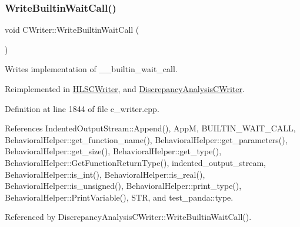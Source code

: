 \subsubsection{\texorpdfstring{Write\+Builtin\+Wait\+Call()}{WriteBuiltinWaitCall()}}
{\footnotesize\ttfamily void C\+Writer\+::\+Write\+Builtin\+Wait\+Call (\begin{DoxyParamCaption}{ }\end{DoxyParamCaption})\hspace{0.3cm}{\ttfamily [virtual]}}



Writes implementation of \+\_\+\+\_\+builtin\+\_\+wait\+\_\+call. 



Reimplemented in \hyperlink{classHLSCWriter_a7261192f62610bd053e5c35361ae1054}{H\+L\+S\+C\+Writer}, and \hyperlink{classDiscrepancyAnalysisCWriter_a614b57f4cd76435c0b7266ac677145d5}{Discrepancy\+Analysis\+C\+Writer}.



Definition at line 1844 of file c\+\_\+writer.\+cpp.



References Indented\+Output\+Stream\+::\+Append(), AppM, B\+U\+I\+L\+T\+I\+N\+\_\+\+W\+A\+I\+T\+\_\+\+C\+A\+LL, Behavioral\+Helper\+::get\+\_\+function\+\_\+name(), Behavioral\+Helper\+::get\+\_\+parameters(), Behavioral\+Helper\+::get\+\_\+size(), Behavioral\+Helper\+::get\+\_\+type(), Behavioral\+Helper\+::\+Get\+Function\+Return\+Type(), indented\+\_\+output\+\_\+stream, Behavioral\+Helper\+::is\+\_\+int(), Behavioral\+Helper\+::is\+\_\+real(), Behavioral\+Helper\+::is\+\_\+unsigned(), Behavioral\+Helper\+::print\+\_\+type(), Behavioral\+Helper\+::\+Print\+Variable(), S\+TR, and test\+\_\+panda\+::type.



Referenced by Discrepancy\+Analysis\+C\+Writer\+::\+Write\+Builtin\+Wait\+Call().

